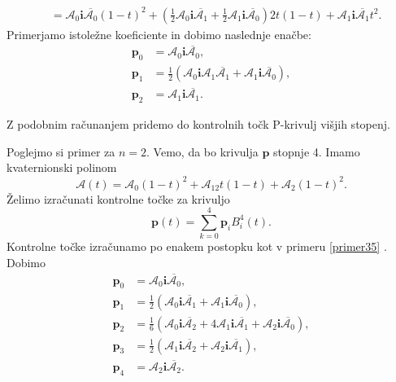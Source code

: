 \documentclass[mat1]{fmfdelo}
\newcommand{\ii}{\boldsymbol i}
\newcommand{\pp}{\boldsymbol p}
\newcommand{\A}{\mathcal A}
\begin{document}
\begin{primer}{\label{primer35}}
\begin{equation*}
\begin{split}
&= \A_0 \ii \overline{\A_0} (1-t)^2 + \left(\frac{1}{2}\A_0\ii\overline{\A_1} +\frac{1}{2} \A_1\ii\overline{\A_0}\right)2t(1-t) + \A_1\ii\overline{\A_1}t^2.
\end{split}
\end{equation*}
Primerjamo istoležne koeficiente in dobimo naslednje enačbe:
\begin{equation*}
\begin{split}
\pp_0&= \A_0\ii\overline{\A_0}, \\
\pp_1&= \frac{1}{2}\left( \A_0\ii\A_1\overline{\A_1} + \A_1\ii\overline{\A_0}\right),\\
\pp_2&= \A_1\ii\overline{\A_1}.
\end{split}
\end{equation*}
\end{primer}
Z podobnim računanjem pridemo do kontrolnih točk P-krivulj višjih stopenj.
\begin{primer}Poglejmo si primer za $n=2$. Vemo, da bo krivulja $\pp$ stopnje 4.
Imamo kvaternionski polinom
\begin{equation*}
	\A(t) = \A_0(1-t)^2 + \A_12t(1-t) + \A_2(1-t)^2.
\end{equation*}
Želimo izračunati kontrolne točke za krivuljo
\begin{equation*}
	\pp(t) = \sum_{k=0}^4\pp_iB_i^4(t).
\end{equation*}
Kontrolne točke izračunamo po enakem postopku kot v primeru \ref{primer35} . Dobimo
\begin{equation*}
\begin{split}
\pp_0 & = \A_0\ii\overline{\A_0}, \\
\pp_1 &= \frac{1}{2}\left( \A_0\ii\overline{\A_1} + \A_1\ii\overline{\A_0} \right), \\
\pp_2 &= \frac{1}{6} \left( \A_0\ii\overline{\A_2} + 4\A_1\ii\overline{\A_1}+\A_2\ii\overline{\A_0} \right), \\
\pp_3 &= \frac{1}{2} \left( \A_1\ii\overline{\A_2}+\A_2\ii\overline{\A_1} \right), \\
\pp_4 &= \A_2\ii\overline{\A_2}.
\end{split}
\end{equation*}
\end{primer}
\end{document}
